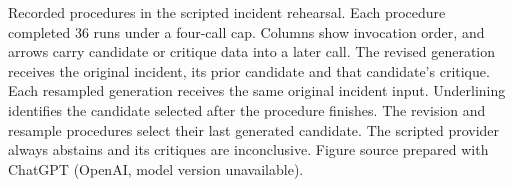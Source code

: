 Recorded procedures in the scripted incident rehearsal. Each procedure completed 36 runs under a four-call cap. Columns show invocation order, and arrows carry candidate or critique data into a later call. The revised generation receives the original incident, its prior candidate and that candidate's critique. Each resampled generation receives the same original incident input. Underlining identifies the candidate selected after the procedure finishes. The revision and resample procedures select their last generated candidate. The scripted provider always abstains and its critiques are inconclusive. Figure source prepared with ChatGPT (OpenAI, model version unavailable).
